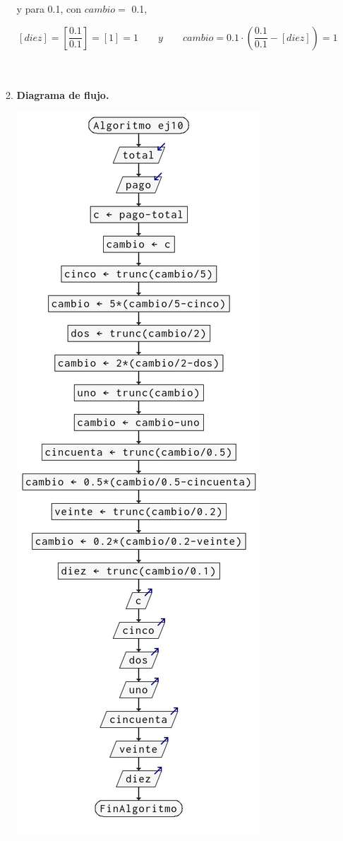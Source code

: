 \begin{enumerate}
\begin{enumerate}[\bfseries a)]
	    y para 0.1, con $cambio = $ 0.1,
	    
	    $$\left[diez\right] = \left[\dfrac{0.1}{0.1}\right] = \left[1\right] = 1 \qquad y \qquad cambio = 0.1 \cdot \left(\dfrac{0.1}{0.1} - [diez]\right) = 1$$\\\\
	    \vspace{2cm}


    \item \textbf{Diagrama de flujo.}\\
	\begin{center}
	    \includegraphics[scale=.45]{imagenes/tarea2/ej10df.png}
	\end{center}
	\vspace{1cm}


\end{enumerate}
\end{enumerate}
